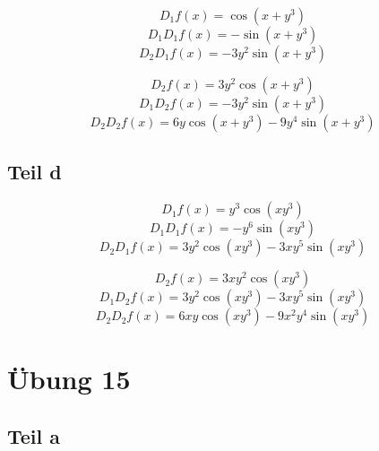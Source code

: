 \documentclass[10pt,a4paper]{article}
\begin{document}
\begin{equation}
D_{1} f(x) = \cos (x + y^{3})
\end{equation}
\begin{equation}
D_{1} D_{1} f(x) = -\sin (x + y^{3})
\end{equation}
\begin{equation}
D_{2} D_{1} f(x) = -3y^{2} \sin(x + y^{3})
\end{equation}

\begin{equation}
D_{2} f(x) = 3y^{2} \cos(x + y^{3})
\end{equation}
\begin{equation}
D_{1} D_{2} f(x) = -3y^{2} \sin(x + y^{3})
\end{equation}
\begin{equation}
D_{2} D_{2} f(x) = 6y \cos(x + y^{3}) - 9y^{4} \sin (x + y^{3})
\end{equation}

\subsection*{Teil d}

\begin{equation}
D_{1} f(x) = y^{3} \cos (xy^{3})
\end{equation}
\begin{equation}
D_{1} D_{1} f(x) = -y^{6} \sin (xy^{3})
\end{equation}
\begin{equation}
D_{2} D_{1} f(x) = 3y^{2} \cos(xy^{3}) - 3xy^{5} \sin(xy^{3})
\end{equation}

\begin{equation}
D_{2} f(x) = 3xy^{2} \cos(xy^{3})
\end{equation}
\begin{equation}
D_{1} D_{2} f(x) = 3y^{2} \cos (xy^{3}) - 3xy^{5} \sin(xy^{3})
\end{equation}
\begin{equation}
D_{2} D_{2} f(x) = 6xy \cos(xy^{3}) - 9x^{2}y^{4} \sin(xy^{3})
\end{equation}

\section*{Übung 15}

\subsection*{Teil a}
\end{document}
